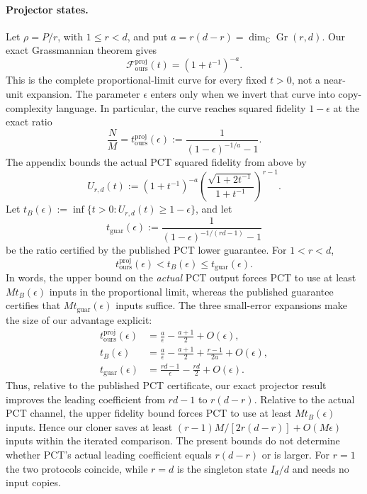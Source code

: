 \documentclass[11pt]{article}
\theoremstyle{remark}
\theoremstyle{plain}
\newcommand{\Gr}{\operatorname{Gr}}
\begin{document}
\paragraph{Projector states.}
Let \(\rho=P/r\), with \(1\le r<d\), and put
\(a=r(d-r)=\dim_{\mathbb C}\Gr(r,d)\).  Our exact Grassmannian theorem gives
\[
  \mathcal F_{\mathrm{ours}}^{\mathrm{proj}}(t)
  =(1+t^{-1})^{-a}.
\]
This is the complete proportional-limit curve for every fixed \(t>0\), not
a near-unit expansion.  The parameter \(\epsilon\) enters only when we
invert that curve into copy-complexity language.  In particular, the curve
reaches squared fidelity \(1-\epsilon\) at the exact ratio
\[
  \frac{N}{M}=t_{\mathrm{ours}}^{\mathrm{proj}}(\epsilon)
  :=\frac{1}{(1-\epsilon)^{-1/a}-1}.
\]
The appendix bounds the actual PCT squared fidelity from above by
\[
  U_{r,d}(t)
  :=(1+t^{-1})^{-a}
    \left(
      \frac{\sqrt{1+2t^{-1}}}{1+t^{-1}}
    \right)^{r-1}.
\]
Let \(t_B(\epsilon):=\inf\{t>0:U_{r,d}(t)\ge1-\epsilon\}\), and let
\[
  t_{\mathrm{guar}}(\epsilon)
  :=\frac{1}{(1-\epsilon)^{-1/(rd-1)}-1}
\]
be the ratio certified by the published PCT lower guarantee.  For
\(1<r<d\),
\[
  t_{\mathrm{ours}}^{\mathrm{proj}}(\epsilon)
  <t_B(\epsilon)\le t_{\mathrm{guar}}(\epsilon).
\]
In words, the upper bound on the \emph{actual} PCT output forces PCT to use
at least \(Mt_B(\epsilon)\) inputs in the proportional limit, whereas the
published guarantee certifies that \(Mt_{\mathrm{guar}}(\epsilon)\) inputs
suffice.  The three small-error expansions make the size of our advantage
explicit:
\begin{align*}
  t_{\mathrm{ours}}^{\mathrm{proj}}(\epsilon)
  &=\frac{a}{\epsilon}-\frac{a+1}{2}+O(\epsilon),\\
  t_B(\epsilon)
  &=\frac{a}{\epsilon}-\frac{a+1}{2}
    +\frac{r-1}{2a}+O(\epsilon),\\
  t_{\mathrm{guar}}(\epsilon)
  &=\frac{rd-1}{\epsilon}-\frac{rd}{2}+O(\epsilon).
\end{align*}
Thus, relative to the published PCT certificate, our exact projector result
improves the leading coefficient from \(rd-1\) to \(r(d-r)\).  Relative to
the actual PCT channel, the upper fidelity bound forces PCT to use at least
\(Mt_B(\epsilon)\) inputs.  Hence our cloner saves at least
\((r-1)M/[2r(d-r)]+O(M\epsilon)\) inputs within the iterated comparison.
The present bounds do not determine whether PCT's actual leading coefficient
equals \(r(d-r)\) or is larger.  For \(r=1\) the two protocols coincide,
while \(r=d\) is the singleton state \(I_d/d\) and needs no input copies.
\end{document}
